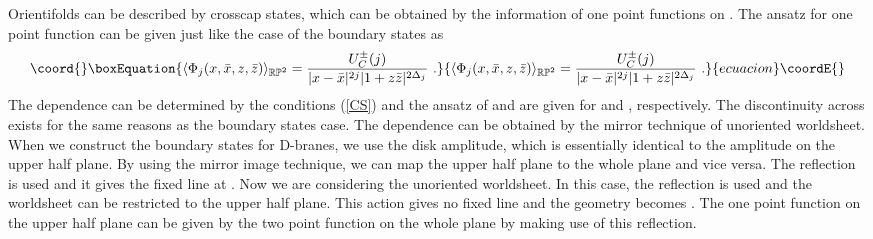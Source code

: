 \documentclass[a4paper,12pt]{article}
\providecommand{\brp}{{\mathbb R \mathbb P}^2}
\begin{document}
Orientifolds can be described by crosscap states, which can be
obtained by the information of one point functions on \myHighlight{$\brp$}\coordHE{}. 
The ansatz for one point function can be given just like the
case of the boundary states as
\begin{equation}\coord{}\boxEquation{
 \langle \Phi_j (x,\bar{x},z,\bar{z}) \rangle _ {\brp} =
   \frac{U^{\pm}_{C} (j)}{|x-\bar{x}|^{2j} |1 + z \bar{z}|^{2 \Delta_j} }~. 
}{
 \langle \Phi_j (x,\bar{x},z,\bar{z}) \rangle _ {\brp} =
   \frac{U^{\pm}_{C} (j)}{|x-\bar{x}|^{2j} |1 + z \bar{z}|^{2 \Delta_j} }~. 
}{ecuacion}\coordE{}\end{equation} 
The \coordHE{} dependence can be determined by the conditions (\ref{CS}) and
the ansatz of \myHighlight{$+$}\coordHE{} and \myHighlight{$-$}\coordHE{} are given for \coordHE{} and \coordHE{},
respectively. 
The discontinuity across \coordHE{} exists for the same reasons as the
boundary states case.
The \coordHE{} dependence can be obtained by the mirror technique
of unoriented worldsheet.
When we construct the boundary states for D-branes, we use the disk
amplitude, which is essentially identical to the amplitude on the upper half
plane. By using the mirror image technique, we can map the upper half
plane to the whole plane and vice versa. 
The reflection \coordHE{} is used and it gives the fixed line at
\coordHE{}.   
Now we are considering the unoriented worldsheet.
In this case, the reflection \coordHE{} is used and the
worldsheet can be restricted to the upper half plane. 
This action gives no fixed line and the geometry becomes \myHighlight{$\brp$}\coordHE{}.  
The one point function on the upper half plane can be given by the two
point function on the whole plane by making use of this reflection.
\end{document}

